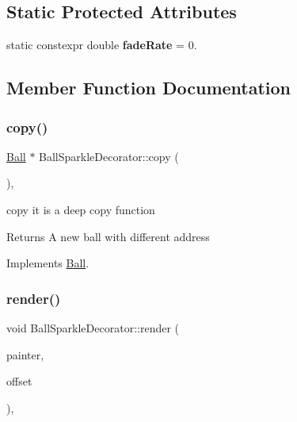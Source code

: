 \subsection*{Static Protected Attributes}
\begin{DoxyCompactItemize}
\item 
\mbox{\label{class_ball_sparkle_decorator_ad4e98ec20a12be0c8b0481879d4c2d17}} 
static constexpr double {\bfseries fade\+Rate} = 0.
\end{DoxyCompactItemize}


\subsection{Member Function Documentation}
\mbox{\label{class_ball_sparkle_decorator_a1fd1b10d028cc51c958eb5c9a7cf732c}} 
\subsubsection{\texorpdfstring{copy()}{copy()}}
{\footnotesize\ttfamily \mbox{\hyperlink{class_ball}{Ball}} $\ast$ Ball\+Sparkle\+Decorator\+::copy (\begin{DoxyParamCaption}{ }\end{DoxyParamCaption})\hspace{0.3cm}{\ttfamily [override]}, {\ttfamily [virtual]}}



copy it is a deep copy function 

\begin{DoxyReturn}{Returns}
A new ball with different address 
\end{DoxyReturn}


Implements \mbox{\hyperlink{class_ball_ae6c0731fabb7a45ba36df62a1975661a}{Ball}}.

\mbox{\label{class_ball_sparkle_decorator_ad3ee562f1cc9dfa5835bca2fab3d30a7}} 
\subsubsection{\texorpdfstring{render()}{render()}}
{\footnotesize\ttfamily void Ball\+Sparkle\+Decorator\+::render (\begin{DoxyParamCaption}\item[{Q\+Painter \&}]{painter,  }\item[{const Q\+Vector2D \&}]{offset }\end{DoxyParamCaption})\hspace{0.3cm}{\ttfamily [override]}, {\ttfamily [virtual]}}



